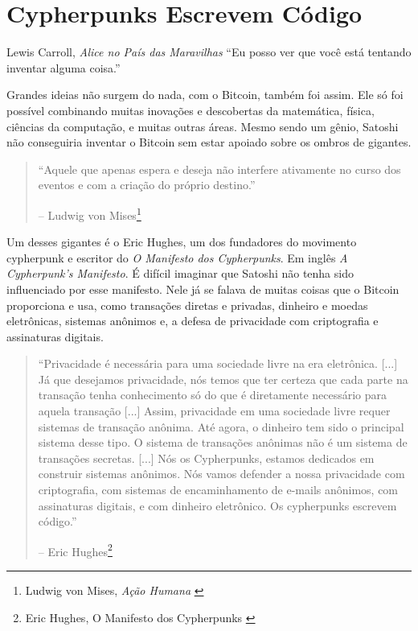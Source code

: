 \chapter{Cypherpunks Escrevem Código}
\label{les:20}

\begin{chapquote}{Lewis Carroll, \textit{Alice no País das Maravilhas}}
\enquote{Eu posso ver que você está tentando inventar alguma coisa.}
\end{chapquote}

Grandes ideias não surgem do nada, com o Bitcoin, também foi assim. 
Ele só foi possível combinando muitas inovações e descobertas da matemática, 
física, ciências da computação, e muitas outras áreas. Mesmo sendo um gênio, 
Satoshi não conseguiria inventar o Bitcoin sem estar apoiado sobre os ombros de gigantes.

\begin{quotation}\begin{samepage}
\enquote{Aquele que apenas espera e deseja não interfere ativamente no curso dos eventos e com a criação do próprio destino.}
\begin{flushright} -- Ludwig von Mises\footnote{Ludwig von Mises, \textit{Ação Humana} \cite{human-action}}
\end{flushright}\end{samepage}\end{quotation}

Um desses gigantes é o Eric Hughes, um dos fundadores do movimento cypherpunk
e escritor do \textit{O Manifesto dos Cypherpunks}. Em inglês \textit{A Cypherpunk's Manifesto}. 
É difícil imaginar que Satoshi não tenha sido influenciado por esse manifesto. Nele já se falava de muitas coisas que o Bitcoin proporciona e usa, como transações diretas e privadas, dinheiro e moedas eletrônicas, sistemas anônimos e, a defesa de privacidade com criptografia e assinaturas digitais.

\begin{quotation}\begin{samepage}
\enquote{Privacidade é necessária para uma sociedade livre na era eletrônica.
	[...] Já que desejamos privacidade, nós temos que ter certeza que cada parte 
	na transação tenha conhecimento só do que é diretamente necessário para 
	aquela transação [...]
	Assim, privacidade em uma sociedade livre requer sistemas de transação anônima. 
	Até agora, o dinheiro tem sido o principal sistema desse tipo.
	O sistema de transações anônimas não é um sistema de transações secretas. [...]
	Nós os Cypherpunks, estamos dedicados em construir sistemas anônimos. Nós vamos 
	defender a nossa privacidade com criptografia, com sistemas de encaminhamento 
	de e-mails anônimos, com assinaturas digitais, e com dinheiro eletrônico. 
	Os cypherpunks escrevem código.}

\begin{flushright} -- Eric Hughes\footnote{Eric Hughes, O Manifesto dos Cypherpunks \cite{cypherpunk-manifesto}}
\end{flushright}\end{samepage}\end{quotation}

